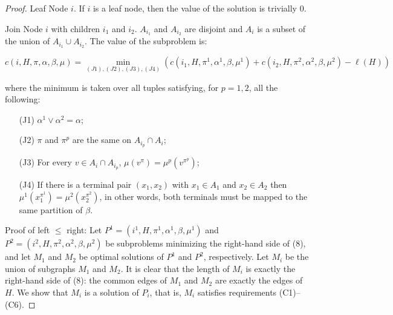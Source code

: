 \begin{proof}
Leaf Node \(i\). If \(i\) is a leaf node, then the value of the solution is trivially 0.

Join Node \(i\) with children \(i_1\) and \(i_2\). \(A_{i_1}\) and \(A_{i_2}\) are disjoint and \(A_i\) is a subset of the union of \(A_{i_1} \cup A_{i_2}\). The value of the subproblem is:

$$c(i, H, \pi, \alpha, \beta, \mu) = \min_{(J1), (J2), (J3), (J4)}(c(i_1, H, \pi^1, \alpha^1, \beta, \mu^1) + c(i_2, H, \pi^2, \alpha^2, \beta, \mu^2) - \ell(H))$$

where the minimum is taken over all tuples satisfying, for \(p = 1, 2\), all the following:

\begin{itemize}
    \item[(J1)] \(\alpha^1 \vee \alpha^2 = \alpha\);
    \item[(J2)] \(\pi\) and \(\pi^p\) are the same on \(A_{i_p} \cap A_i\);
    \item[(J3)] For every \(v \in A_i \cap A_{i_p}\), \(\mu(v^\pi) = \mu^p(v^{\pi^p})\);
    \item[(J4)] If there is a terminal pair \((x_1, x_2)\) with \(x_1 \in A_1\) and \(x_2 \in A_2\) then \(\mu^1(x_1^{\pi^1}) = \mu^2(x_2^{\pi^2})\), in other words, both terminals must be mapped to the same partition of \(\beta\).
\end{itemize}

Proof of left \(\leq\) right:
Let \(P^1 = (i^1, H, \pi^1, \alpha^1, \beta, \mu^1)\) and \(P^2 = (i^2, H, \pi^2, \alpha^2, \beta, \mu^2)\) be subproblems minimizing the right-hand side of (8), and let \(M_1\) and \(M_2\) be optimal solutions of \(P^1\) and \(P^2\), respectively. Let \(M_i\) be the union of subgraphs \(M_1\) and \(M_2\). It is clear that the length of \(M_i\) is exactly the right-hand side of (8): the common edges of \(M_1\) and \(M_2\) are exactly the edges of \(H\). We show that \(M_i\) is a solution of \(P_i\), that is, \(M_i\) satisfies requirements (C1)–(C6).


\end{proof}
